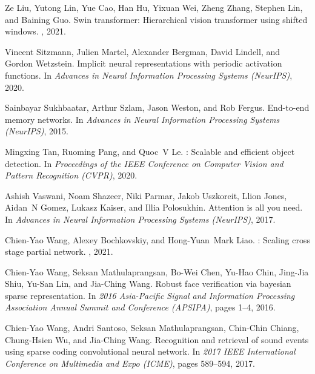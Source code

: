 \documentclass[10pt,twocolumn,letterpaper]{article}
\begin{document}
{\begin{thebibliography}{10}
	Ze Liu, Yutong Lin, Yue Cao, Han Hu, Yixuan Wei, Zheng Zhang, Stephen Lin, and
	Baining Guo.
	\newblock Swin transformer: Hierarchical vision transformer using shifted
	windows.
	, 2021.
	
	Vincent Sitzmann, Julien Martel, Alexander Bergman, David Lindell, and Gordon
	Wetzstein.
	\newblock Implicit neural representations with periodic activation functions.
	\newblock In {\em Advances in Neural Information Processing Systems (NeurIPS)},
	2020.
	
	Sainbayar Sukhbaatar, Arthur Szlam, Jason Weston, and Rob Fergus.
	\newblock End-to-end memory networks.
	\newblock In {\em Advances in Neural Information Processing Systems (NeurIPS)},
	2015.
	
	Mingxing Tan, Ruoming Pang, and Quoc~V Le.
	: Scalable and efficient object detection.
	\newblock In {\em Proceedings of the IEEE Conference on Computer Vision and
		Pattern Recognition (CVPR)}, 2020.
	
	Ashish Vaswani, Noam Shazeer, Niki Parmar, Jakob Uszkoreit, Llion Jones,
	Aidan~N Gomez, Lukasz Kaiser, and Illia Polosukhin.
	\newblock Attention is all you need.
	\newblock In {\em Advances in Neural Information Processing Systems (NeurIPS)},
	2017.
	
	Chien-Yao Wang, Alexey Bochkovskiy, and Hong-Yuan~Mark Liao.
	: Scaling cross stage partial network.
	, 2021.
	
	Chien-Yao Wang, Seksan Mathulaprangsan, Bo-Wei Chen, Yu-Hao Chin, Jing-Jia
	Shiu, Yu-San Lin, and Jia-Ching Wang.
	\newblock Robust face verification via bayesian sparse representation.
	\newblock In {\em 2016 Asia-Pacific Signal and Information Processing
		Association Annual Summit and Conference (APSIPA)}, pages 1--4, 2016.
	
	Chien-Yao Wang, Andri Santoso, Seksan Mathulaprangsan, Chin-Chin Chiang,
	Chung-Hsien Wu, and Jia-Ching Wang.
	\newblock Recognition and retrieval of sound events using sparse coding
	convolutional neural network.
	\newblock In {\em 2017 IEEE International Conference on Multimedia and Expo
		(ICME)}, pages 589--594, 2017.
	

\end{thebibliography}}
\end{document}
